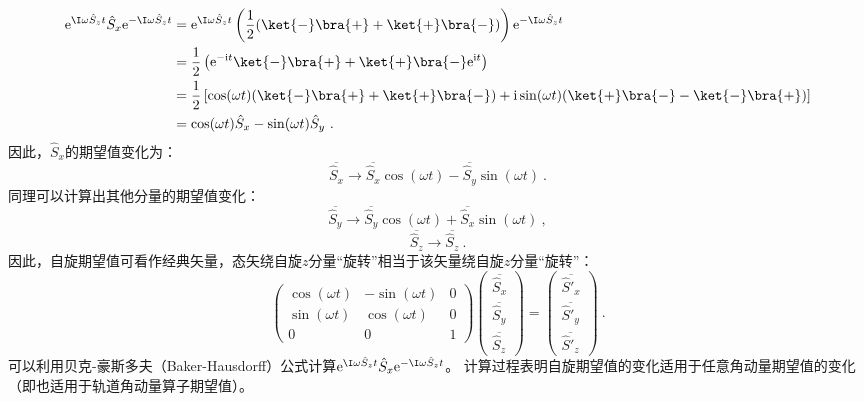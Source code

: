 \begin{equation}
\begin{aligned}
\mathrm e^{ \I\omega \hat S_zt}\hat S_x\mathrm e^{- \I\omega \hat S_zt}&=\mathrm e^{ \I\omega \hat S_zt}\left(\frac{1}{2}(\ket{-}\bra{+}+\ket{+}\bra{-})\right)\mathrm e^{- \I\omega \hat S_zt}\\
 &=\frac{1}{2}\left(\mathrm e^{-\mathrm i t}\ket{-}\bra{+}+\ket{+}\bra{-}\mathrm e^{\mathrm i t}\right)\\
 &=\frac{1}{2}\left[\cos(\omega t)(\ket{-}\bra{+}+\ket{+}\bra{-})+\mathrm i\sin(\omega t)(\ket{+}\bra{-}-\ket{-}\bra{+})\right]\\
 &=\cos(\omega t) \hat S_x-\sin(\omega t) \hat S_y~.
\end{aligned}
\end{equation}
因此，$\hat S_x$的期望值变化为：
\begin{equation}
\overline{\hat S_x}\rightarrow  \overline{\hat S_x}\cos(\omega t)-\overline{\hat S_y}\sin(\omega t)~.
\end{equation}
同理可以计算出其他分量的期望值变化：
\begin{equation}
\overline{\hat S_y}\rightarrow \overline{\hat S_y}\cos(\omega t)+\overline{\hat S_x}\sin(\omega t)~,
\end{equation}
\begin{equation}
\overline{\hat S_z}\rightarrow \overline{\hat S_z}~.
\end{equation}
因此，自旋期望值可看作经典矢量，态矢绕自旋$z$分量“旋转”相当于该矢量绕自旋$z$分量“旋转”：
\begin{equation}
\begin{pmatrix}
 \cos(\omega t) &-\sin(\omega t)  &0 \\
  \sin(\omega t) & \cos(\omega t)  & 0\\
  0& 0 &1
\end{pmatrix}
\begin{pmatrix}
 \overline{\hat S_x}\\
  \overline{\hat S_y}\\
 \overline{\hat S_z}
\end{pmatrix}
=
\begin{pmatrix}
  \overline{\hat S'_x}\\
  \overline{\hat S'_y}\\
 \overline{\hat S'_z}
\end{pmatrix}~.
\end{equation}
可以利用贝克-豪斯多夫（Baker-Hausdorff）公式计算$\mathrm e^{ \I\omega \hat S_zt}\hat S_x\mathrm e^{- \I\omega \hat S_zt}$。
计算过程表明自旋期望值的变化适用于任意角动量期望值的变化（即也适用于轨道角动量算子期望值）。



